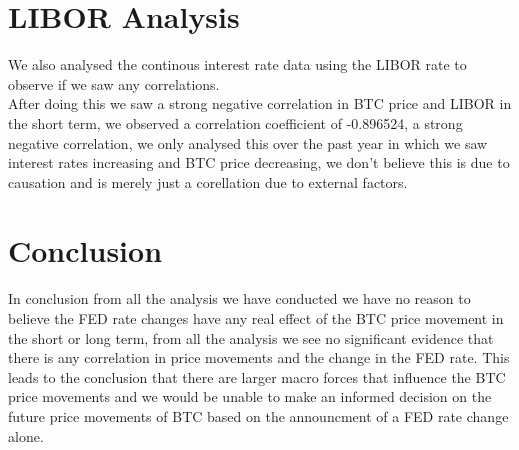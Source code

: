 \documentclass[12pt]{article}
\begin{document}
\newpage
\section{LIBOR Analysis}
We also analysed the continous interest rate data using the LIBOR rate to observe if we saw any correlations.\\

After doing this we saw a strong negative correlation in BTC price and LIBOR in the short term, we observed a correlation coefficient of -0.896524, a strong negative correlation, we only analysed this over the past year in which we saw interest rates increasing and BTC price decreasing, we don't believe this is due to causation and is merely just a corellation due to external factors.
\section{Conclusion}
In conclusion from all the analysis we have conducted we have no reason to believe the FED rate changes have any real effect of the BTC price movement in the short or long term, from all the analysis we see no significant evidence that there is any correlation in price movements and the change in the FED rate. This leads to the conclusion that there are larger macro forces that influence the BTC price movements and we would be unable to make an informed decision on the future price movements of BTC based on the announcment of a FED rate change alone.
\end{document}
